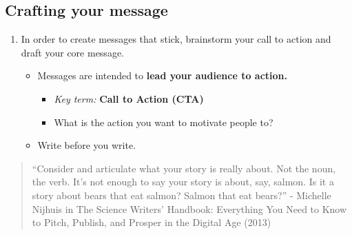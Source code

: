 \documentclass[
]{book}
\providecommand{\tightlist}{%
  \setlength{\itemsep}{0pt}\setlength{\parskip}{0pt}}
\begin{document}
\hypertarget{crafting-your-message}{%
\subsection{Crafting your message}\label{crafting-your-message}}

\begin{enumerate}
\def\labelenumi{\arabic{enumi}.}
\tightlist
\item
  In order to create messages that stick, brainstorm your call to action and draft your core message.

  \begin{itemize}
  \tightlist
  \item
    Messages are intended to \textbf{lead your audience to action.}

    \begin{itemize}
    \tightlist
    \item
      \emph{Key term: }\textbf{Call to Action (CTA)}
    \item
      What is the action you want to motivate people to?
    \end{itemize}
  \item
    Write before you write.
  \end{itemize}
\end{enumerate}

\begin{quote}
``Consider and articulate what your story is really about. Not the noun, the verb. It's not enough to say your story is about, say, salmon. Is it a story about bears that eat salmon? Salmon that eat bears?'' - Michelle Nijhuis in The Science Writers' Handbook: Everything You Need to Know to Pitch, Publish, and Prosper in the Digital Age (2013)
\end{quote}
\end{document}
